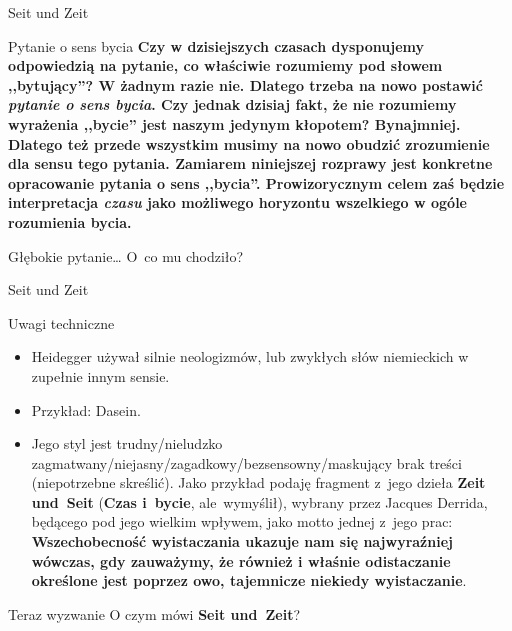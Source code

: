 \documentclass{beamer}  %
\begin{document}
\begin{frame}{Seit und Zeit}

  \begin{block}{Pytanie o sens bycia}
    \textbf{Czy w dzisiejszych czasach dysponujemy odpowiedzią na
      pytanie, co właściwie rozumiemy pod słowem ,,bytujący''? W
      żadnym razie nie. Dlatego trzeba na nowo postawić \emph{pytanie
        o sens bycia}. Czy jednak dzisiaj fakt, że nie rozumiemy
      wyrażenia ,,bycie'' jest naszym jedynym kłopotem? Bynajmniej.
      Dlatego też przede wszystkim musimy na nowo obudzić zrozumienie
      dla sensu tego pytania. Zamiarem niniejszej rozprawy jest
      konkretne opracowanie pytania o sens ,,bycia''. Prowizorycznym
      celem zaś będzie interpretacja \emph{czasu} jako możliwego
      horyzontu wszelkiego w ogóle rozumienia bycia.}
  \end{block}

  \begin{block}{Głębokie pytanie\ldots}
    O~co mu chodziło?
  \end{block}

\end{frame}



\begin{frame}{Seit und Zeit}

  \begin{block}{Uwagi techniczne}
    \begin{itemize}
    \item Heidegger używał silnie neologizmów, lub zwykłych słów
      niemieckich w zupełnie innym sensie.
    \item Przykład: Dasein.
    \item Jego styl jest trudny/nieludzko
      zagmatwany/niejasny/zagadkowy/bezsensowny/maskujący brak treści
      (niepotrzebne skreślić). Jako przykład podaję fragment z~jego
      dzieła \textbf{Zeit und~Seit} (\textbf{Czas i~bycie},
      ale~wymyślił), wybrany przez Jacques Derrida, będącego pod jego
      wielkim wpływem, jako motto jednej
      z~jego prac: \\
      \textbf{Wszechobecność wyistaczania ukazuje nam się najwyraźniej
        wówczas, gdy zauważymy, że również i właśnie odistaczanie
        określone jest poprzez owo, tajemnicze niekiedy wyistaczanie}.
    \end{itemize}
    \pause
  \end{block}

  \begin{block}{Teraz wyzwanie}
    O czym mówi \textbf{Seit und~Zeit}?
  \end{block}

\end{frame}
\end{document}
